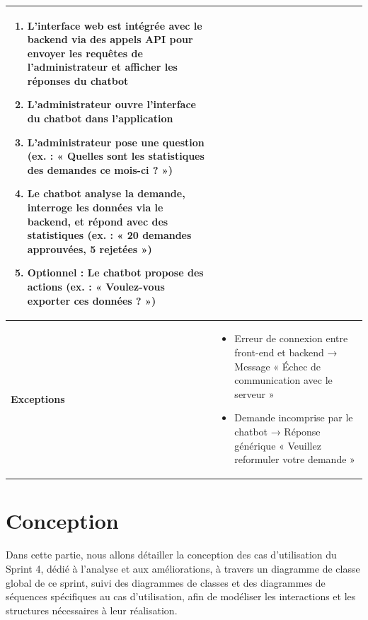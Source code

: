 \begin{table}[!ht]
\begin{adjustwidth}{-3.5cm}{-3.5cm}
\begin{tabular}{|p{4.2cm}|p{11cm}|}
\begin{enumerate}
    \item L’interface web est intégrée avec le backend via des appels API pour envoyer les requêtes de l’administrateur et afficher les réponses du chatbot
    \item L’administrateur ouvre l’interface du chatbot dans l’application
    \item L’administrateur pose une question (ex. : « Quelles sont les statistiques des demandes ce mois-ci ? »)
    \item Le chatbot analyse la demande, interroge les données via le backend, et répond avec des statistiques (ex. : « 20 demandes approuvées, 5 rejetées »)
    \item Optionnel : Le chatbot propose des actions (ex. : « Voulez-vous exporter ces données ? »)
    \end{enumerate} \\
    \hline
    \textbf{Exceptions} & 
    \begin{itemize}
    \item Erreur de connexion entre front-end et backend → Message « Échec de communication avec le serveur »
    \item Demande incomprise par le chatbot → Réponse générique « Veuillez reformuler votre demande »
    \end{itemize} \\
    \hline
    \end{tabular}
\end{adjustwidth}
\end{table}
\clearpage
\section{Conception}
Dans cette partie, nous allons détailler la conception des cas d’utilisation du Sprint 4, dédié à l’analyse et aux améliorations, à travers un diagramme de classe global de ce sprint, suivi des diagrammes de classes et des diagrammes de séquences spécifiques au cas d’utilisation, afin de modéliser les interactions et les structures nécessaires à leur réalisation.
